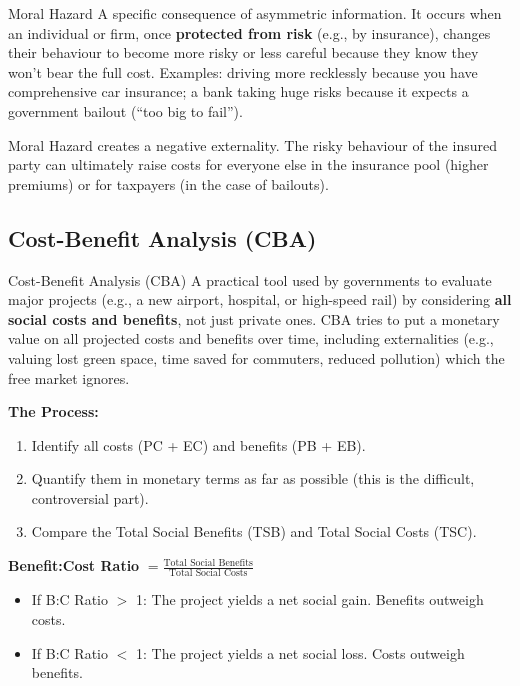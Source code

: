 \documentclass[11pt, a4paper, twoside]{book}
\begin{document}
\begin{keyterm}{Moral Hazard}
A specific consequence of asymmetric information. It occurs when an individual or firm, once \textbf{protected from risk} (e.g., by insurance), changes their behaviour to become more risky or less careful because they know they won't bear the full cost. Examples: driving more recklessly because you have comprehensive car insurance; a bank taking huge risks because it expects a government bailout (``too big to fail'').
\end{keyterm}

Moral Hazard creates a negative externality. The risky behaviour of the insured party can ultimately raise costs for everyone else in the insurance pool (higher premiums) or for taxpayers (in the case of bailouts).

\subsection{Cost-Benefit Analysis (CBA)}

\begin{keyterm}{Cost-Benefit Analysis (CBA)}
A practical tool used by governments to evaluate major projects (e.g., a new airport, hospital, or high-speed rail) by considering \textbf{all social costs and benefits}, not just private ones. CBA tries to put a monetary value on all projected costs and benefits over time, including externalities (e.g., valuing lost green space, time saved for commuters, reduced pollution) which the free market ignores.
\end{keyterm}

\textbf{The Process:}
\begin{enumerate}
  \item Identify all costs (PC + EC) and benefits (PB + EB).
  \item Quantify them in monetary terms as far as possible (this is the difficult, controversial part).
  \item Compare the Total Social Benefits (TSB) and Total Social Costs (TSC).
\end{enumerate}

\textbf{Benefit:Cost Ratio} $= \frac{\text{Total Social Benefits}}{\text{Total Social Costs}}$

\begin{itemize}
  \item If B:C Ratio $>$ 1: The project yields a net social gain. Benefits outweigh costs.
  \item If B:C Ratio $<$ 1: The project yields a net social loss. Costs outweigh benefits.
\end{itemize}
\end{document}
